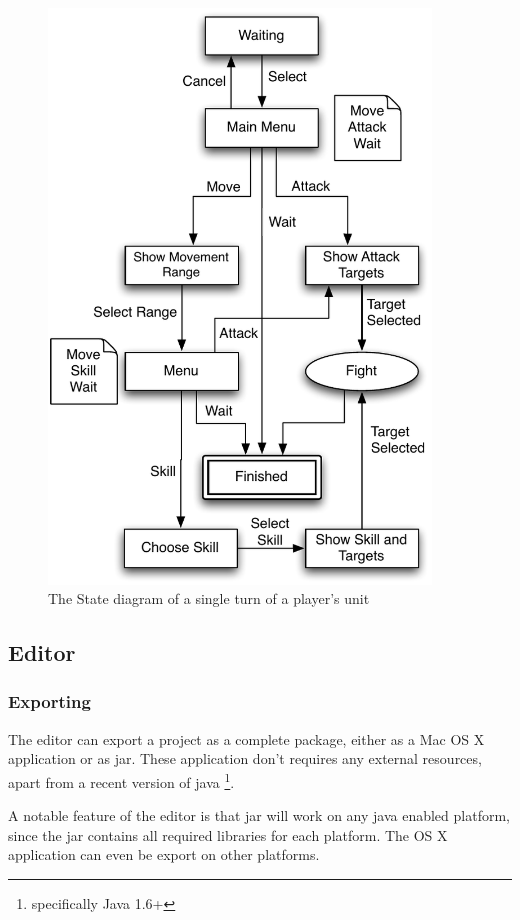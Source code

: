 \begin{figure}[htbp]
	\centering
		\includegraphics[width=4in]{figures/unit.pdf}
	\caption{The State diagram of a single turn of a player's unit}
	\label{fig:figures_unit}
\end{figure}


\subsection{Editor}

\subsubsection{Exporting}
The editor can export a project as a complete package, either as a Mac OS X application or as jar. These application don't requires any external resources, apart from a recent version of java \footnote{specifically Java 1.6+}.

A notable feature of the editor is that jar will work on any java enabled platform, since the jar contains all required libraries for each platform. The OS X application can even be export on other platforms.

